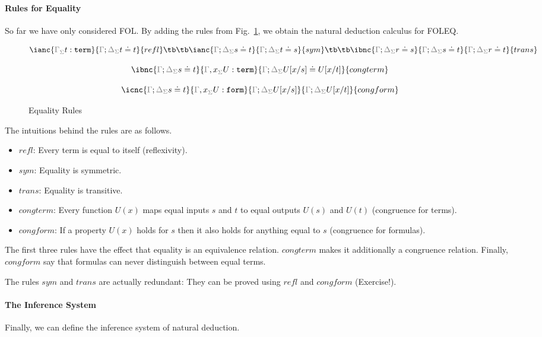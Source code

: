 \paragraph{Rules for Equality}
So far we have only considered FOL. By adding the rules from Fig.~\ref{fig:foleq:nd}, we obtain the natural deduction calculus for FOLEQ.

\begin{figure}[htb]
\begin{center}
\[
\ianc{\isterm{\gSigma}{\gGamma}{t}}{\gdseqa{t\doteq t}}{refl}
\tb\tb
\ianc{\gdseqa{s\doteq t}}{\gdseqa{t\doteq s}}{sym}
\tb\tb
\ibnc{\gdseqa{r\doteq s}}{\gdseqa{s\doteq t}}{\gdseqa{r\doteq t}}{trans}
\]

\[
\ibnc{\gdseqa{s\doteq t}}{\isterm{\gSigma}{\gGamma,x}{U}}{\gdseqa{U[\sub{x}{s}]\doteq U[\sub{x}{t}]}}{congterm}
\]

\[
\icnc{\gdseqa{s\doteq t}}{\isform{\gSigma}{\gGamma,x}{U}}{\gdseqa{U[\sub{x}{s}]}}{\gdseqa{U[\sub{x}{t}]}}{congform}
\]
\caption{Equality Rules}\label{fig:foleq:nd}
\end{center}
\end{figure}

The intuitions behind the rules are as follows.
\begin{itemize}
 \item $refl$: Every term is equal to itself (reflexivity).
 \item $sym$: Equality is symmetric.
 \item $trans$: Equality is transitive.
 \item $congterm$: Every function $U(x)$ maps equal inputs $s$ and $t$ to equal outputs $U(s)$ and $U(t)$ (congruence for terms).
 \item $congform$: If a property $U(x)$ holds for $s$ then it also holds for anything equal to $s$ (congruence for formulas).
\end{itemize}

The first three rules have the effect that equality is an equivalence relation. $congterm$ makes it additionally a congruence relation. Finally, $congform$ say that formulas can never distinguish between equal terms.

The rules $sym$ and $trans$ are actually redundant: They can be proved using $refl$ and $congform$ (Exercise!).

\paragraph{The Inference System}
Finally, we can define the inference system of natural deduction.

